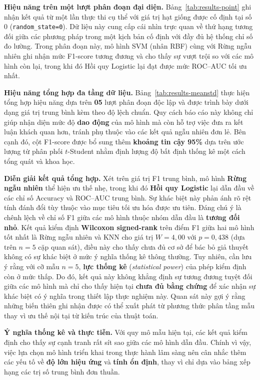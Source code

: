 \documentclass[14pt,a4paper]{extreport}
\begin{document}
\textbf{Hiệu năng trên một lượt phân đoạn đại diện.} Bảng~\ref{tab:results-point} ghi nhận kết quả từ một lần thực thi cụ thể với giá trị hạt giống được cố định tại số 0 (\texttt{random\_state=0}). Dữ liệu này cung cấp cái nhìn trực quan về thứ hạng tương đối giữa các phương pháp trong một kịch bản cố định với đầy đủ hệ thống chỉ số đo lường. Trong phân đoạn này, mô hình SVM (nhân RBF) cùng với Rừng ngẫu nhiên ghi nhận mức F1-score tương đương và cho thấy sự vượt trội so với các mô hình còn lại, trong khi đó Hồi quy Logistic lại đạt được mức ROC--AUC tối ưu nhất.

\textbf{Hiệu năng tổng hợp đa tầng dữ liệu.} Bảng~\ref{tab:results-meanstd} thực hiện tổng hợp hiệu năng dựa trên \textbf{05} lượt phân đoạn độc lập và được trình bày dưới dạng giá trị trung bình kèm theo độ lệch chuẩn. Quy cách báo cáo này không chỉ giúp nhận diện mức độ \textbf{dao động} của mô hình mà còn hỗ trợ việc đưa ra kết luận khách quan hơn, tránh phụ thuộc vào các kết quả ngẫu nhiên đơn lẻ. Bên cạnh đó, cột F1-score được bổ sung thêm \textbf{khoảng tin cậy 95\%} dựa trên ước lượng từ phân phối $t$-Student nhằm định lượng độ bất định thống kê một cách tổng quát và khoa học.

\textbf{Diễn giải kết quả tổng hợp.} Xét trên giá trị F1 trung bình, mô hình \textbf{Rừng ngẫu nhiên} thể hiện ưu thế nhẹ, trong khi đó \textbf{Hồi quy Logistic} lại dẫn đầu về các chỉ số Accuracy và ROC--AUC trung bình. Sự khác biệt này phản ánh rõ rệt tính đánh đổi tùy thuộc vào mục tiêu tối ưu hóa được ưu tiên. Đáng chú ý là chênh lệch về chỉ số F1 giữa các mô hình thuộc nhóm dẫn đầu là \textbf{tương đối nhỏ}. Kết quả kiểm định \textbf{Wilcoxon signed-rank} trên điểm F1 giữa hai mô hình tốt nhất là Rừng ngẫu nhiên và KNN cho giá trị $W=4,00$ với $p=0,438$ (dựa trên $n=5$ cặp quan sát), điều này cho thấy chưa đủ cơ sở để bác bỏ giả thuyết không có sự khác biệt ở mức ý nghĩa thống kê thông thường. Tuy nhiên, cần lưu ý rằng với cỡ mẫu $n=5$, \textbf{lực thống kê} (\textit{statistical power}) của phép kiểm định còn ở mức thấp. Do đó, kết quả này không khẳng định sự tương đương tuyệt đối giữa các mô hình mà chỉ cho thấy hiện tại \textbf{chưa đủ bằng chứng} để xác nhận sự khác biệt có ý nghĩa trong thiết lập thực nghiệm này. Quan sát này gợi ý rằng những biến thiên ghi nhận được có thể xuất phát từ phương thức phân tầng mẫu thay vì ưu thế nội tại từ kiến trúc của thuật toán.

\textbf{Ý nghĩa thống kê và thực tiễn.} Với quy mô mẫu hiện tại, các kết quả kiểm định cho thấy sự cạnh tranh rất sít sao giữa các mô hình dẫn đầu. Chính vì vậy, việc lựa chọn mô hình triển khai trong thực hành lâm sàng nên cân nhắc thêm các yếu tố về \textbf{độ lớn hiệu ứng} và \textbf{tính ổn định}, thay vì chỉ dựa vào bảng xếp hạng các trị số trung bình đơn thuần.
\end{document}
